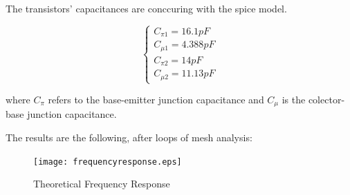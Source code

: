The transistors' capacitances are conccuring with the spice model.

\begin{equation}
 \begin{cases}
  C_{\pi 1}=16.1pF\\
  C_{\mu 1}=4.388pF\\
  C_{\pi 2}=14pF\\
  C_{\mu 2}=11.13pF
 \end{cases}
\end{equation}

where $C_{\pi}$ refers to the base-emitter junction capacitance and $C_{\mu}$ is the colector-base junction capacitance.

The results are the following, after loops of mesh analysis:

 \begin{figure}[h] \centering
\texttt{[image: frequencyresponse.eps]}
\vspace{-5mm}
\caption{Theoretical Frequency Response}\label{fig:rc}
\end{figure}


\newpage

